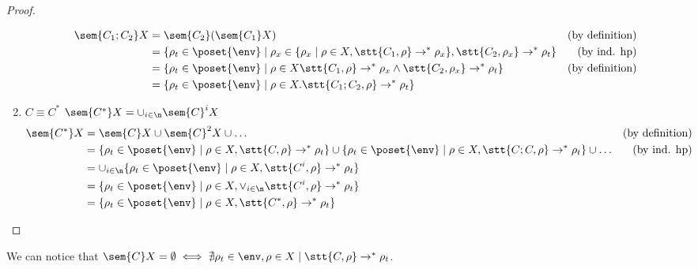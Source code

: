 \begin{proof}
\begin{enumerate}
\begin{align*}
      \sem{C_1;C_2}X & = \sem{C_2}(\sem{C_1}X) & \text{(by definition)}\\
      & = \{\rho_t \in\poset{\env} \mid \rho_x \in \{\rho_x \mid \rho \in X, \stt{C_1, \rho}  \to^* \rho_x\}, \stt{C_2, \rho_x} \to^* \rho_t\} & \text{(by ind. hp)}\\
      & = \{\rho_t \in\poset{\env} \mid \rho \in X \stt{C_1, \rho} \to^* \rho_x \wedge \stt{C_2, \rho_x} \to^* \rho_t\} & \text{(by definition)}\\
      & = \{\rho_t \in\poset{\env} \mid \rho \in X . \stt{C_1;C_2, \rho} \to^* \rho_t\}
    \end{align*}
  \item \(C \equiv C^*\) \(\sem{C^*}X = \cup_{i\in\n}\sem{C}^i X\)
    \begin{align*}
      \sem{C^*}X & = \sem{C}X \cup \sem{C}^2X \cup \dots & \text{(by definition)}\\
      & = \{\rho_t \in\poset{\env} \mid \rho \in X, \stt{C,\rho} \to^* \rho_t\} \cup \{\rho_t \in\poset{\env} \mid \rho \in X, \stt{C;C,\rho} \to^* \rho_t\} \cup \dots & \text{(by ind. hp)}\\
      & = \cup_{i\in\n} \{\rho_t \in\poset{\env} \mid \rho \in X, \stt{C^i, \rho} \to^*  \rho_t\} \\
      & = \{\rho_t \in\poset{\env} \mid \rho \in X, \vee_{i\in\n} \stt{C^i, \rho} \to^* \rho_t\} \\
      & = \{\rho_t \in\poset{\env} \mid \rho \in X, \stt{C^*, \rho} \to^* \rho_t\}
    \end{align*}
  \end{enumerate}
\end{proof}

We can notice that \(\sem{C}X = \emptyset \iff \nexists \rho_t\in\env, \rho \in X
\mid \stt{C,\rho} \to^* \rho_t\).
